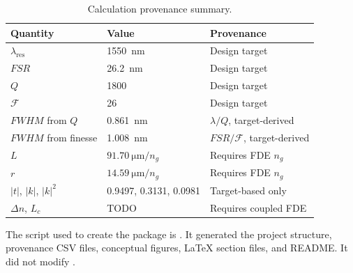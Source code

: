 \begin{table}[H]
\centering
\caption{Calculation provenance summary.}
\label{tab:calculation-provenance}
\begin{tabular}{lll}
\toprule
Quantity & Value & Provenance \\
\midrule
\(\lambda_{\mathrm{res}}\) & \SI{1550}{\nano\metre} & Design target \\
\(FSR\) & \SI{26.2}{\nano\metre} & Design target \\
\(Q\) & 1800 & Design target \\
\(\mathcal{F}\) & 26 & Design target \\
\(FWHM\) from \(Q\) & \SI{0.861}{\nano\metre} & \(\lambda/Q\), target-derived \\
\(FWHM\) from finesse & \SI{1.008}{\nano\metre} & \(FSR/\mathcal{F}\), target-derived \\
\(L\) & \(\SI{91.70}{\micro\metre}/n_g\) & Requires FDE \(n_g\) \\
\(r\) & \(\SI{14.59}{\micro\metre}/n_g\) & Requires FDE \(n_g\) \\
\(|t|\), \(|k|\), \(|k|^2\) & 0.9497, 0.3131, 0.0981 & Target-based only \\
\(\Delta n\), \(L_c\) & TODO & Requires coupled FDE \\
\bottomrule
\end{tabular}
\end{table}

The script used to create the package is . It generated the project structure, provenance CSV files, conceptual figures, LaTeX section files, and README. It did not modify .
